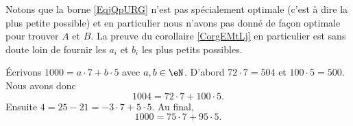 %
Notons que la borne \eqref{EqjQpURG} n'est pas spécialement optimale (c'est à dire la plus petite possible) et en particulier nous n'avons pas donné de façon optimale pour trouver \( A\) et \( B\). La preuve du corollaire \ref{CorgEMtLj} en particulier est sans doute loin de fournir les \( a_i\) et \( b_i\) les plus petits possibles.

\begin{example}
    Écrivons \( 1000=a\cdot 7+b\cdot 5\) avec \( a,b\in \eN\). D'abord \( 72\cdot 7=504\) et \( 100\cdot 5=500\). Nous avons donc 
    \begin{equation}
        1004=72\cdot 7+100\cdot 5.
    \end{equation}
    Ensuite \( 4=25-21=-3\cdot 7+5\cdot 5\). Au final,
    \begin{equation}
        1000=75\cdot 7+95\cdot 5.
    \end{equation}
\end{example}

